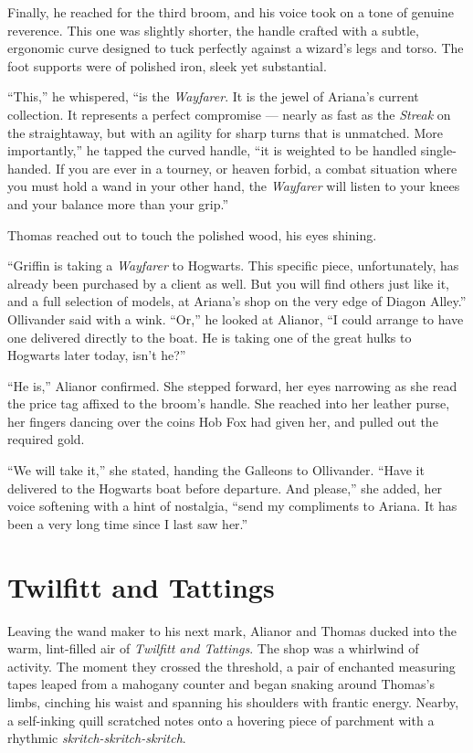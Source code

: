 Finally, he reached for the third broom, and his voice took on a tone of genuine reverence. This one was slightly shorter, the handle crafted with a subtle, ergonomic curve designed to tuck perfectly against a wizard's legs and torso. The foot supports were of polished iron, sleek yet substantial.

\enquote{This,} he whispered, \enquote{is the \textit{Wayfarer}. It is the jewel of Ariana's current collection. It represents a perfect compromise --- nearly as fast as the \textit{Streak} on the straightaway, but with an agility for sharp turns that is unmatched. More importantly,} he tapped the curved handle, \enquote{it is weighted to be handled single-handed. If you are ever in a tourney, or heaven forbid, a combat situation where you must hold a wand in your other hand, the \textit{Wayfarer} will listen to your knees and your balance more than your grip.}

Thomas reached out to touch the polished wood, his eyes shining.

\enquote{Griffin is taking a \textit{Wayfarer} to Hogwarts. This specific piece, unfortunately, has already been purchased by a client as well. But you will find others just like it, and a full selection of models, at Ariana's shop on the very edge of Diagon Alley.} Ollivander said with a wink. \enquote{Or,} he looked at Alianor, \enquote{I could arrange to have one delivered directly to the boat. He is taking one of the great hulks to Hogwarts later today, isn't he?}

\enquote{He is,} Alianor confirmed. She stepped forward, her eyes narrowing as she read the price tag affixed to the broom's handle. She reached into her leather purse, her fingers dancing over the coins Hob Fox had given her, and pulled out the required gold.

\enquote{We will take it,} she stated, handing the Galleons to Ollivander. \enquote{Have it delivered to the Hogwarts boat before departure. And please,} she added, her voice softening with a hint of nostalgia, \enquote{send my compliments to Ariana. It has been a very long time since I last saw her.}

\section*{Twilfitt and Tattings}

Leaving the wand maker to his next mark, Alianor and Thomas ducked into the warm, lint-filled air of \textit{Twilfitt and Tattings}. The shop was a whirlwind of activity. The moment they crossed the threshold, a pair of enchanted measuring tapes leaped from a mahogany counter and began snaking around Thomas's limbs, cinching his waist and spanning his shoulders with frantic energy. Nearby, a self-inking quill scratched notes onto a hovering piece of parchment with a rhythmic \textit{skritch-skritch-skritch}.

